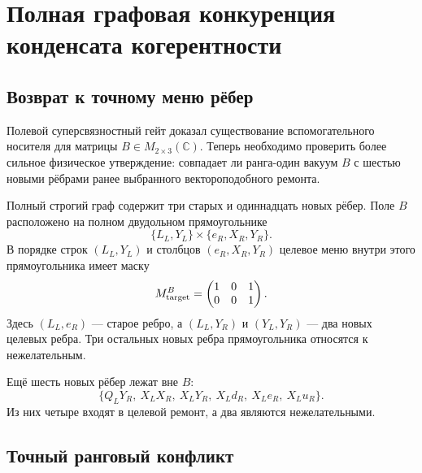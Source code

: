 \chapter{Полная графовая конкуренция конденсата когерентности}
\label{ch:v7-edge-coherence-full-graph-competition-gate}

\section{Возврат к точному меню рёбер}

Полевой суперсвязностный гейт доказал существование вспомогательного
носителя для матрицы $B\in M_{2\times3}(\mathbb C)$. Теперь необходимо
проверить более сильное физическое утверждение: совпадает ли ранга-один
вакуум $B$ с шестью новыми рёбрами ранее выбранного вектороподобного
ремонта.

Полный строгий граф содержит три старых и одиннадцать новых рёбер. Поле
$B$ расположено на полном двудольном прямоугольнике
\begin{equation}
 \{L_L,Y_L\}\times\{e_R,X_R,Y_R\}.
 \label{eq:v7-full-graph-coherence-biclique}
\end{equation}
В порядке строк $(L_L,Y_L)$ и столбцов $(e_R,X_R,Y_R)$ целевое меню внутри
этого прямоугольника имеет маску
\begin{equation}
 M_{\rm target}^{B}
 =\begin{pmatrix}1&0&1\\0&0&1\end{pmatrix}.
 \label{eq:v7-full-graph-target-mask}
\end{equation}
Здесь $(L_L,e_R)$ --- старое ребро, а $(L_L,Y_R)$ и $(Y_L,Y_R)$ --- два
новых целевых ребра. Три остальных новых ребра прямоугольника относятся к
нежелательным.

Ещё шесть новых рёбер лежат вне $B$:
\begin{equation}
 \{Q_LY_R,\ X_LX_R,\ X_LY_R,\ X_Ld_R,\ X_Le_R,\ X_Lu_R\}.
 \label{eq:v7-full-graph-outside-edges}
\end{equation}
Из них четыре входят в целевой ремонт, а два являются нежелательными.

\section{Точный ранговый конфликт}

